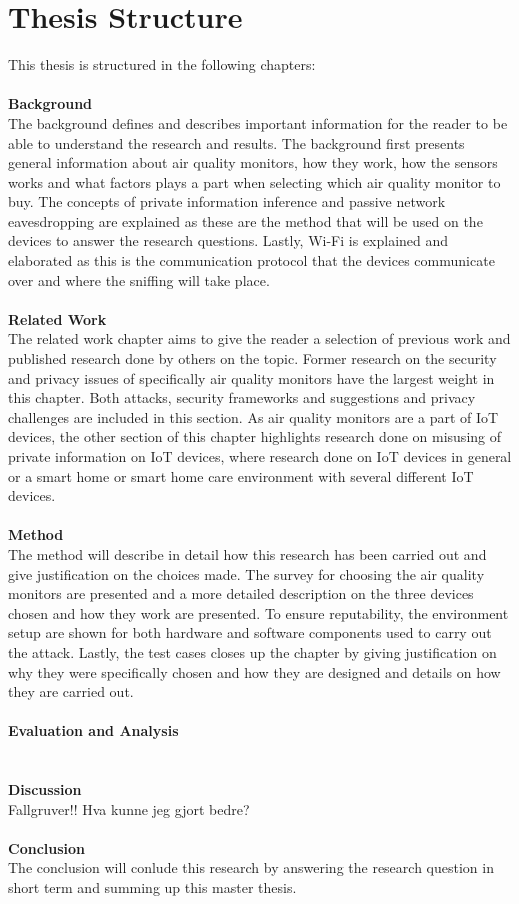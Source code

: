 \section{Thesis Structure}
This thesis is structured in the following chapters:\\\\
\textbf{Background}
\\
The background defines and describes important information for the reader to be able to understand the research and results. The background first presents general information about air quality monitors, how they work, how the sensors works and what factors plays a part when selecting which air quality monitor to buy. The concepts of private information inference and passive network eavesdropping are explained as these are the method that will be used on the devices to answer the research questions. Lastly, Wi-Fi is explained and elaborated as this is the communication protocol that the devices communicate over and where the sniffing will take place. 
\\\\
\textbf{Related Work}
\\
The related work chapter aims to give the reader a selection of previous work and published research done by others on the topic. Former research on the security and privacy issues of specifically air quality monitors have the largest weight in this chapter. Both attacks, security frameworks and suggestions and privacy challenges are included in this section. As air quality monitors are a part of IoT devices, the other section of this chapter highlights research done on misusing of private information on IoT devices, where research done on IoT devices in general or a smart home or smart home care environment with several different IoT devices. 
\\\\
\textbf{Method}
\\
The method will describe in detail how this research has been carried out and give justification on the choices made. The survey for choosing the air quality monitors are presented and a more detailed description on the three devices chosen and how they work are presented. To ensure reputability, the environment setup are shown for both hardware and software components used to carry out the attack. Lastly, the test cases closes up the chapter by giving justification on why they were specifically chosen and how they are designed and details on how they are carried out. 
\\\\
\textbf{Evaluation and Analysis}
\\
\\\\
\textbf{Discussion}
\\
Fallgruver!! Hva kunne jeg gjort bedre?
\\\\
\textbf{Conclusion}
\\
The conclusion will conlude this research by answering the research question in short term and summing up this master thesis. 